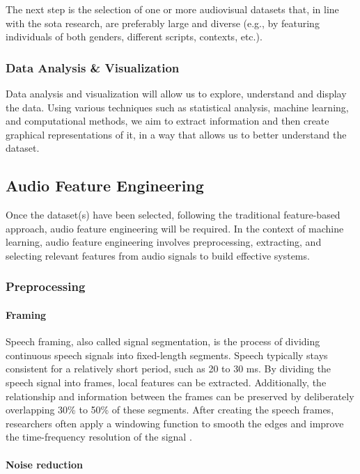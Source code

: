 The next step is the selection of one or more audiovisual datasets that, in line with the \ac{sota} research, are preferably large and diverse (e.g., by featuring individuals of both genders, different scripts, contexts, etc.).

\subsubsection{Data Analysis \& Visualization}

Data analysis and visualization will allow us to explore, understand and display the data. Using various techniques such as statistical analysis, machine learning, and computational methods, we aim to extract information and then create graphical representations of it, in a way that allows us to better understand the dataset. 

\subsection{Audio Feature Engineering}

Once the dataset(s) have been selected, following the traditional feature-based approach, audio feature engineering will be required. In the context of machine learning, audio feature engineering involves preprocessing, extracting, and selecting relevant features from audio signals to build effective systems.

\subsubsection{Preprocessing}

\paragraph{Framing}

Speech framing, also called signal segmentation, is the process of dividing continuous speech signals into fixed-length segments. Speech typically stays consistent for a relatively short period, such as 20 to 30 ms. By dividing the speech signal into frames, local features can be extracted. Additionally, the relationship and information between the frames can be preserved by deliberately overlapping 30\% to 50\% of these segments. After creating the speech frames, researchers often apply a windowing function to smooth the edges and improve the time-frequency resolution of the signal \cite{Akay2020}.

\paragraph{Noise reduction}

